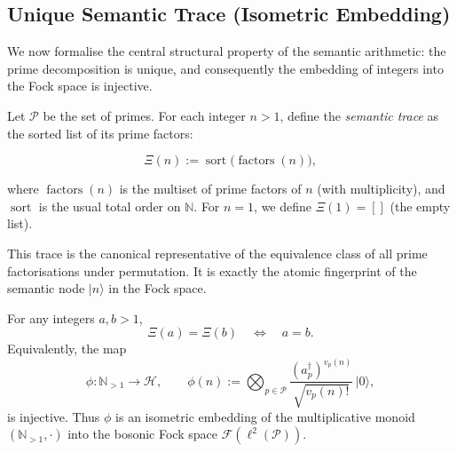 \subsection{Unique Semantic Trace (Isometric Embedding)}

We now formalise the central structural property of the semantic arithmetic: the prime decomposition is unique, and consequently the embedding of integers into the Fock space is injective.

Let $\mathcal{P}$ be the set of primes. For each integer $n > 1$, define the \emph{semantic trace} as the sorted list of its prime factors:

\[
\Xi(n) := \operatorname{sort}\bigl( \operatorname{factors}(n) \bigr),
\]

where $\operatorname{factors}(n)$ is the multiset of prime factors of $n$ (with multiplicity), and $\operatorname{sort}$ is the usual total order on $\mathbb{N}$. For $n = 1$, we define $\Xi(1) = []$ (the empty list).

This trace is the canonical representative of the equivalence class of all prime factorisations under permutation. It is exactly the atomic fingerprint of the semantic node $|n\rangle$ in the Fock space.

\begin{theorem}
\label{thm:semantic_trace_unique}
For any integers $a, b > 1$,
\[
\Xi(a) = \Xi(b) \quad\Longleftrightarrow\quad a = b.
\]
Equivalently, the map
\[
\phi : \mathbb{N}_{>1} \longrightarrow \mathcal{H}, \qquad
\phi(n) := \bigotimes_{p \in \mathcal{P}} \frac{(a_p^\dagger)^{v_p(n)}}{\sqrt{v_p(n)!}}\,|0\rangle,
\]
is injective. Thus $\phi$ is an isometric embedding of the multiplicative monoid $(\mathbb{N}_{>1}, \cdot)$ into the bosonic Fock space $\mathcal{F}(\ell^2(\mathcal{P}))$.

\end{theorem}

